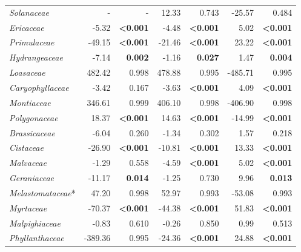 \documentclass[12pt]{article}
\begin{document}
\begin{table}[!h]
\begin{tabular}{|l  rrr rrr|}
    \emph{Solanaceae}       &  -     & -                       &   12.33 & 0.743                   & -25.57 & 0.484 \\
    \emph{Ericaceae}        &  -5.32 & \textbf{\textless0.001} &   -4.48 & \textbf{\textless0.001} &   5.02 & \textbf{\textless0.001} \\
    \emph{Primulaceae}      & -49.15 & \textbf{\textless0.001} &  -21.46 & \textbf{\textless0.001} &  23.22 & \textbf{\textless0.001} \\
    \emph{Hydrangeaceae}    &  -7.14 & \textbf{0.002}          &   -1.16 & \textbf{0.027}          &   1.47 & \textbf{0.004} \\
    \emph{Loasaceae}        & 482.42 & 0.998                   &  478.88 & 0.995                   &-485.71 & 0.995 \\
    \emph{Caryophyllaceae}  &  -3.42 & 0.167                   &   -3.63 & \textbf{\textless0.001} &   4.09 & \textbf{\textless0.001} \\
    \emph{Montiaceae}       & 346.61 & 0.999                   &  406.10 & 0.998                   &-406.90 & 0.998 \\
    \emph{Polygonaceae}     &  18.37 & \textbf{\textless0.001} &   14.63 & \textbf{\textless0.001} & -14.99 & \textbf{\textless0.001} \\
    \emph{Brassicaceae}     &  -6.04 & 0.260                   &   -1.34 & 0.302                   &   1.57 & 0.218 \\
    \emph{Cistaceae}        & -26.90 & \textbf{\textless0.001} &  -10.81 & \textbf{\textless0.001} &  13.33 & \textbf{\textless0.001} \\
    \emph{Malvaceae}        &  -1.29 & 0.558                   &   -4.59 & \textbf{\textless0.001} &   5.02 & \textbf{\textless0.001} \\
    \emph{Geraniaceae}      & -11.17 & \textbf{0.014}          &   -1.25 & 0.730                   &   9.96 & \textbf{0.013} \\
    \emph{Melastomataceae}* &  47.20 & 0.998                   &   52.97 & 0.993                   & -53.08 & 0.993 \\
    \emph{Myrtaceae}        & -70.37 & \textbf{\textless0.001} &  -44.38 & \textbf{\textless0.001} &  51.83 & \textbf{\textless0.001} \\
    \emph{Malpighiaceae}    &  -0.83 & 0.610                   &   -0.26 & 0.850                   &   0.99 & 0.513 \\
    \emph{Phyllanthaceae}   &-389.36 & 0.995                   &  -24.36 & \textbf{\textless0.001} &  24.88 & \textbf{\textless0.001} \\

\end{tabular}
\end{table}
\end{document}
